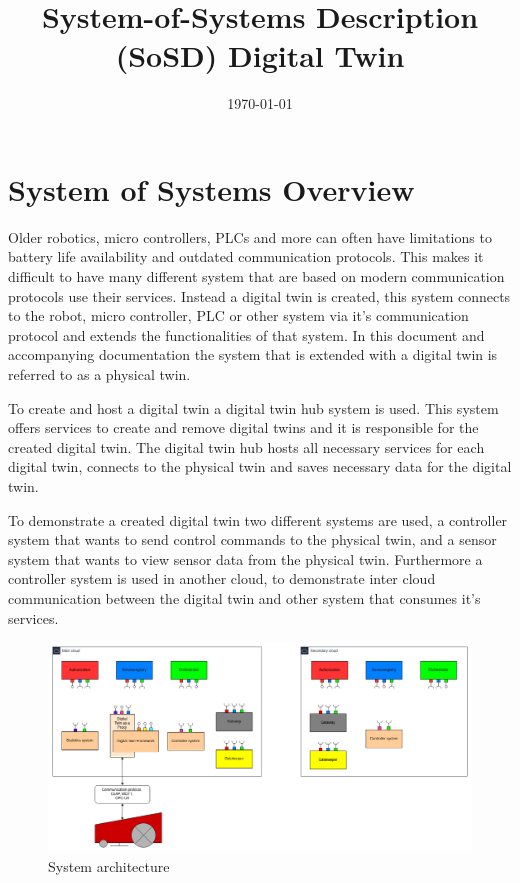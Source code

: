 \documentclass{article}
\date{\today} & 1.0 \\
\title{System-of-Systems Description (SoSD) Digital Twin}
\begin{document}
\maketitle


\setcounter{tocdepth}{10}
\renewcommand\contentsname{}
\tableofcontents
\newpage

\section{System of Systems Overview}
Older robotics, micro controllers, PLCs and more can often have limitations to battery life availability and outdated communication protocols. This makes it difficult to have many different system that are based on modern communication protocols use their services. Instead a digital twin is created, this system connects to the robot, micro controller, PLC or other system via it's communication protocol and extends the functionalities of that system. In this document and accompanying documentation the system that is extended with a digital twin is referred to as a physical twin.

To create and host a digital twin a digital twin hub system is used. This system offers services to create and remove digital twins and it is responsible for the created digital twin. The digital twin hub hosts all necessary services for each digital twin, connects to the physical twin and saves necessary data for the digital twin. 

To demonstrate a created digital twin two different systems are used, a controller system that wants to send control commands to the physical twin, and a sensor system that wants to view sensor data from the physical twin. Furthermore a controller system is used in another cloud, to demonstrate inter cloud communication between the digital twin and other system that consumes it's services.

\begin{figure}[H]
    \centering
    \includegraphics[width=\textwidth,height=\textheight,keepaspectratio]{figures/IoT-digital-twin-usecase.drawio.png}
    \caption{System architecture}
    \label{fig:architecture}
\end{figure}
\end{document}
